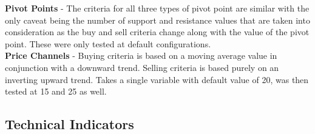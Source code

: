 \documentclass[conference]{IEEEtran}
\begin{document}
\textbf{Pivot Points} - The criteria for all three types of pivot point are similar with the only caveat being the number of support and resistance values that are taken into consideration as the buy and sell criteria change along with the value of the pivot point. These were only tested at default configurations.\\
\textbf{Price Channels} - Buying criteria is based on a moving average value in conjunction with a downward trend. Selling criteria is based purely on an inverting upward trend. Takes a single variable with default value of 20, was then tested at 15 and 25 as well.\\

\subsection{Technical Indicators}
\end{document}
